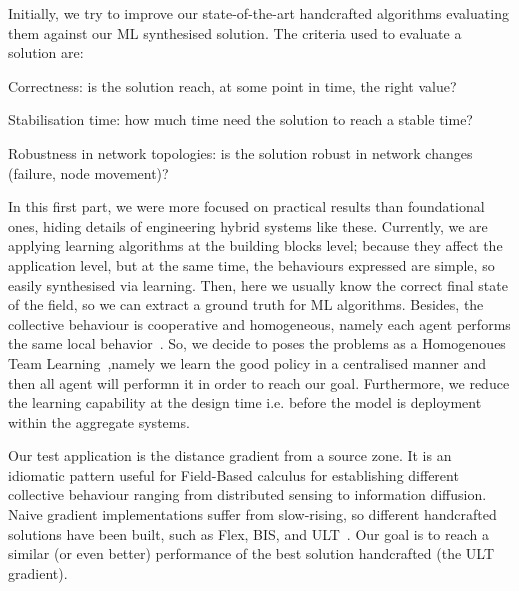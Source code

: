 \documentclass[conference]{IEEEtran}
\begin{document}
Initially, we try to improve our state-of-the-art handcrafted algorithms evaluating them against our ML synthesised solution.
%
The criteria used to evaluate a solution are:
\begin{enumerate*}[label=(\roman*)]
    \item Correctness: is the solution reach, at some point in time, the right value?
    \item Stabilisation time: how much time need the solution to reach a stable time?
    \item Robustness in network topologies: is the solution robust in network changes (failure, node movement)?
\end{enumerate*}

In this first part, we were more focused on practical results than foundational ones, hiding details of engineering hybrid systems like these.  
%
Currently, we are applying learning algorithms at the building blocks level; because they affect the application level, but at the same time, the behaviours expressed are simple, so easily synthesised via learning.
%
Then, here we usually know the correct final state of the field, so we can extract a ground truth for ML algorithms.
%
Besides, the collective behaviour is cooperative and homogeneous, namely each agent performs the same local behavior~\cite{DBLP:journals/aamas/PanaitL05}.  %
%
So, we decide to poses the problems as a Homogenoues Team Learning~\cite{DBLP:journals/aamas/PanaitL05},namely we learn the good policy in a centralised manner and then all agent will performn it in order to reach our goal. 
%
Furthermore, we reduce the learning capability at the design time i.e. before the model is deployment within the aggregate systems.

Our test application is the distance gradient from a source zone. %
%
It is an idiomatic pattern useful for Field-Based calculus for establishing different collective behaviour ranging from distributed sensing to information diffusion.
%
Naive gradient implementations suffer from slow-rising, so different handcrafted solutions have been built, such as Flex, BIS, and ULT~\cite{DBLP:conf/saso/AudritoCDV17}.
%
Our goal is to reach a similar (or even better) performance of the best solution handcrafted (the ULT gradient).
\end{document}
